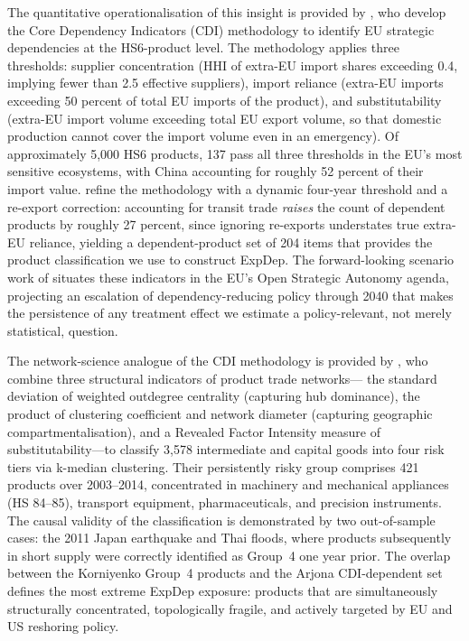 The quantitative operationalisation of this insight is provided by \citet{euc2021},
who develop the Core Dependency Indicators (CDI) methodology to identify EU strategic
dependencies at the HS6-product level. The methodology applies three thresholds:
supplier concentration (HHI of extra-EU import shares exceeding 0.4, implying fewer
than 2.5 effective suppliers), import reliance (extra-EU imports exceeding 50 percent
of total EU imports of the product), and substitutability (extra-EU import volume
exceeding total EU export volume, so that domestic production cannot cover the import
volume even in an emergency). Of approximately 5,000 HS6 products, 137 pass all three
thresholds in the EU's most sensitive ecosystems, with China accounting for roughly
52 percent of their import value. \citet{arjona2023} refine the methodology with a
dynamic four-year threshold and a re-export correction: accounting for transit trade
\emph{raises} the count of dependent products by roughly 27 percent, since ignoring
re-exports understates true extra-EU reliance, yielding a dependent-product set of
204 items that provides the product classification we use to construct ExpDep.
The forward-looking scenario work of \citet{cagnin2021} situates these indicators in
the EU's Open Strategic Autonomy agenda, projecting an escalation of dependency-reducing
policy through 2040 that makes the persistence of any treatment effect we estimate a
policy-relevant, not merely statistical, question.

The network-science analogue of the CDI methodology is provided by
\citet{korniyenko2017}, who combine three structural indicators of product trade networks---
the standard deviation of weighted outdegree centrality (capturing hub dominance), the
product of clustering coefficient and network diameter (capturing geographic
compartmentalisation), and a Revealed Factor Intensity measure of substitutability---to
classify 3,578 intermediate and capital goods into four risk tiers via k-median
clustering. Their persistently risky group comprises 421 products over 2003--2014,
concentrated in machinery and mechanical appliances (HS 84--85), transport equipment,
pharmaceuticals, and precision instruments. The causal validity of the classification
is demonstrated by two out-of-sample cases: the 2011 Japan earthquake and Thai floods,
where products subsequently in short supply were correctly identified as Group~4 one
year prior. The overlap between the Korniyenko Group~4 products and the
Arjona CDI-dependent set defines the most extreme ExpDep exposure: products
that are simultaneously structurally concentrated, topologically fragile, and actively
targeted by EU and US reshoring policy.

